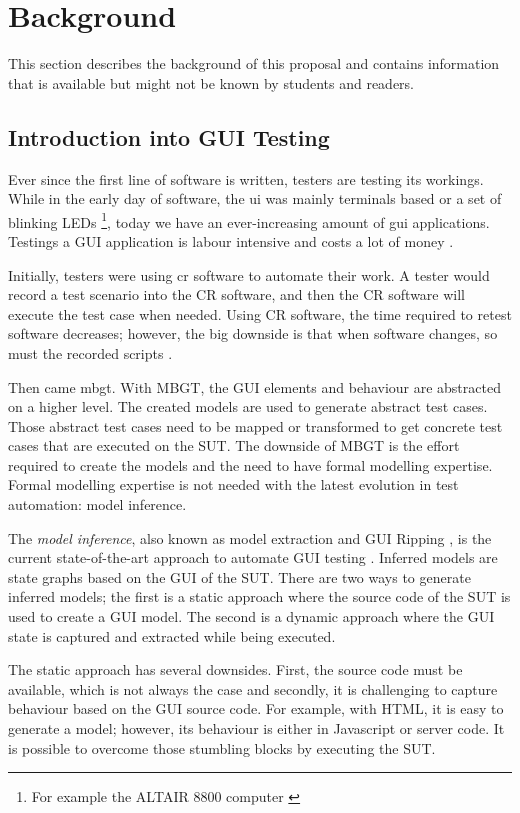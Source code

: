 \section{Background} \label{background}
This section describes the background of this proposal and contains information that is available but might not be known by students and readers. 

\subsection{Introduction into GUI Testing}
Ever since the first line of software is written, testers are testing its workings. While in the early day of software, the \acrfull{ui} was mainly terminals based or a set of blinking LEDs \cite{altair8800} \footnote{For example the ALTAIR 8800 computer \cite{altair8800}}, today we have an ever-increasing amount of \acrfull{gui} applications. Testings a GUI application is labour intensive and costs a lot of money \cite{gui-history}.

Initially, testers were using \acrfull{cr} software to automate their work. A tester would record a test scenario into the CR software, and then the CR software will execute the test case when needed. Using CR software, the time required to retest software decreases; however, the big downside is that when software changes, so must the recorded scripts \cite{gui-history}.

Then came \acrfull{mbgt}. With MBGT, the GUI elements and behaviour are abstracted on a higher level. The created models are used to generate abstract test cases. Those abstract test cases need to be mapped or transformed to get concrete test cases that are executed on the SUT. The downside of MBGT is the effort required to create the models and the need to have formal modelling expertise. Formal modelling expertise is not needed with the latest evolution in test automation: model inference. 

The \emph{model inference}, also known as model extraction and GUI Ripping \cite{gui-ripping}, is the current state-of-the-art approach to automate GUI testing \cite{gui-history}. Inferred models are state graphs based on the GUI of the SUT. There are two ways to generate inferred models; the first is a static approach where the source code of the  SUT is used to create a GUI model. The second is a dynamic approach where the GUI state is captured and extracted while being executed. 

The static approach has several downsides. First, the source code must be available, which is not always the case and secondly, it is challenging to capture behaviour based on the GUI source code. For example, with HTML, it is easy to generate a model; however, its behaviour is either in Javascript or server code.  It is possible to overcome those stumbling blocks by executing the SUT.
    

